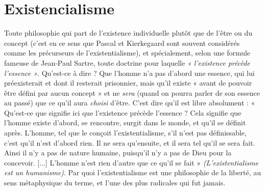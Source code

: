 \section{Existencialisme}
Toute philosophie qui part de l’existence individuelle
plutôt que de l’être ou du concept (c’est en ce sens que
Pascal et Kierkegaard sont souvent considérés comme les précurseurs de l’existentialisme),
et spécialement, selon une formule fameuse de Jean-Paul Sartre,
toute doctrine pour laquelle {\it « l'existence précède l'essence »}. Qu'est-ce à dire ?
Que l’homme n’a pas d’abord une essence, qui lui préexisterait et dont il resterait
prisonnier, mais qu'il existe « avant de pouvoir être défini par aucun
concept » et ne {\it sera} (quand on pourra parler de son essence au passé) que ce
qu’il aura {\it choisi} d’être. C’est dire qu’il est libre absolument : « Qu'est-ce que
signifie ici que l’existence précède l’essence ? Cela signifie que l’homme existe
d’abord, se rencontre, surgit dans le monde, et qu’il se définit après. L'homme,
tel que le conçoit l’existentialisme, s’il n’est pas définissable, c’est qu’il n’est
d’abord rien. Il ne sera qu’ensuite, et il sera tel qu’il se sera fait. Ainsi il n’y a
pas de nature humaine, puisqu'il n’y a pas de Dieu pour la concevoir. [...]
L'homme n’est rien d’autre que ce qu’il se fait » {\it (L'existentialisme est un humanisme)}.
Par quoi l’existentialisme est une philosophie de la liberté, au sens
métaphysique du terme, et l’une des plus radicales qui fut jamais.

